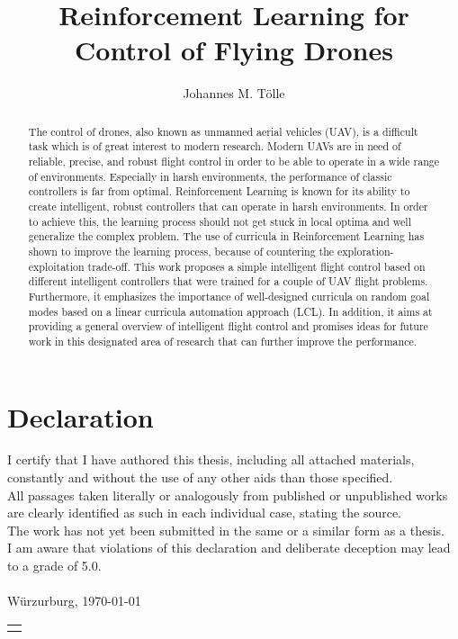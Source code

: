 \documentclass[bachelor,english]{infothesis}
\title{Reinforcement Learning for Control of Flying Drones}
\author{Johannes M. Tölle}
\newenvironment{declaration}
{\chapter*{Declaration}}
{\clearpage}
\begin{document}
\newpage 
\thispagestyle{empty}
\quad 
\newpage
{}
	
\begin{declaration}
	I certify that I have authored this thesis, including all attached materials,
	constantly and without the use of any other aids than those specified.\\
	All passages taken literally or analogously from published or unpublished works
	are clearly identified as such in each individual case, stating the source.\\
	The work has not yet been submitted in the same or a similar form as a thesis.\\
	I am aware that violations of this declaration and deliberate deception may lead to
	a grade of 5.0.\\
	\vspace*{12cm}\\
	Würzurburg, \today 
	\hspace*{\fill}\begin{tabular}{@{}l@{}}\hline
	\makebox[4cm]{Johannes M. Tölle}
	\end{tabular}
\end{declaration}

\tableofcontents
\listoffigures
\listoftables
\listofalgorithms

\newpage 
\thispagestyle{empty}
\quad 
\newpage

\begin{abstract}
	The control of drones, also known as unmanned aerial vehicles (UAV), 
	is a difficult task which is of great interest to modern research.
	Modern UAVs are in need of reliable, precise, and robust flight control in order to
	be able to operate in a wide range of environments. Especially in harsh environments,
	the performance of classic controllers is far from optimal.
	Reinforcement Learning is known for its ability to create intelligent, robust
	controllers that can operate in harsh environments. In order to achieve this, the learning process
	should not get stuck in local optima and well generalize the complex problem. The use 
	of curricula in Reinforcement Learning has shown to improve the learning process, because
	of countering the exploration-exploitation trade-off.
	This work proposes a simple intelligent flight control based on 
	different intelligent controllers that were trained for
	a couple of UAV flight problems. Furthermore, it emphasizes the importance of 
	well-designed curricula on random goal modes based on a linear curricula automation approach (LCL).
	In addition, it aims at providing a general overview of intelligent flight
	control and promises ideas for future work in this designated area of research that can further improve 
	the performance.
\end{abstract}
\end{document}
